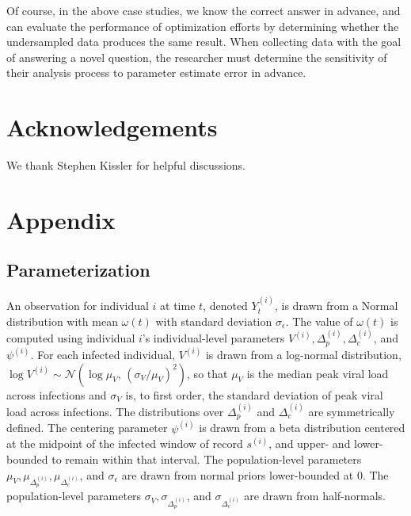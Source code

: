 \documentclass[11pt,notitlepage]{article}
\begin{document}
Of course, in the above case studies, we know the correct answer in advance, and can evaluate the performance of optimization efforts by determining whether the undersampled data produces the same result.
When collecting data with the goal of answering a novel question, the researcher must determine the sensitivity of their analysis process to parameter estimate error in advance.

\section{Acknowledgements}
We thank Stephen Kissler for helpful discussions.

\section{Appendix}

\subsection{Parameterization}\label{appendix:parameterization}
An observation for individual $i$ at time $t$, denoted $Y_t^{(i)}$, is drawn from a Normal distribution with mean $\omega(t)$ with standard deviation $\sigma_\epsilon$.
The value of $\omega(t)$ is computed using individual $i$'s individual-level parameters $V^{(i)}, \Delta_p^{(i)}, \Delta_c^{(i)}$, and $\psi^{(i)}$.
For each infected individual, $V^{(i)}$ is drawn from a log-normal distribution, $\log V^{(i)} \sim \mathcal{N}\left(\log \mu_V, \, (\sigma_V / \mu_V)^2\right)$, so that $\mu_V$ is the median peak viral load across infections and $\sigma_V$ is, to first order, the standard deviation of peak viral load across infections.
The distributions over $\Delta_p^{(i)}$ and $\Delta_c^{(i)}$ are symmetrically defined.
The centering parameter $\psi^{(i)}$ is drawn from a beta distribution centered at the midpoint of the infected window of record $s^{(i)}$, and upper- and lower- bounded to remain within that interval.
The population-level parameters $\mu_V, \mu_{\Delta_p^{(i)}}, \mu_{\Delta_c^{(i)}}$, and $\sigma_\epsilon$ are drawn from normal priors lower-bounded at 0.
The population-level parameters $\sigma_V, \sigma_{\Delta_p^{(i)}}$, and $\sigma_{\Delta_c^{(i)}}$ are drawn from half-normals.
\end{document}
